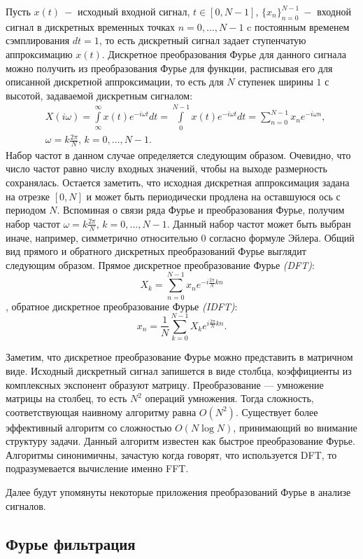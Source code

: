 Пусть $x(t) ~-$ исходный входной сигнал,  $t \in [0, N-1]$, $\{x_n\}_{n=0}^{N-1} ~-$ входной сигнал в дискретных временных точках $n=0,\dots,N-1$ c постоянным временем сэмплирования $dt=1$, то есть дискретный сигнал задает ступенчатую аппроксимацию $x(t)$.
Дискретное преобразования Фурье для данного сигнала можно получить из преобразования Фурье для функции, расписывая его для описанной дискретной аппроксимации, то есть для $N$ ступенек ширины $1$ с высотой, задаваемой дискретным сигналом:
\begin{align*}  
& X(i \omega) = \int \limits_{\infty}^{\infty} x(t) e^{-i\omega t} dt = \int \limits_{0}^{N-1} x(t) e^{-i\omega t} dt = \sum \limits _{n=0}^{N-1} x_n e^{-i \omega n},\\
& \omega=k \frac{2 \pi}{N}, \, k=0,\dots,N-1.
\end{align*}
Набор частот в данном случае определяется следующим образом. Очевидно, что число частот равно числу входных значений, чтобы на выходе размерность сохранялась. Остается заметить, что исходная дискретная аппроксимация задана на отрезке $[0, N]$ и может быть периодически продлена на оставшуюся ось с периодом $N$. Вспоминая о связи ряда Фурье и преобразования Фурье, получим набор частот $\omega=k \frac{2 \pi}{N}, \, k=0,\dots,N-1$. Данный набор частот может быть выбран иначе, например, симметрично относительно $0$ согласно формуле Эйлера.
Общий вид прямого и обратного дискретных преобразований Фурье выглядит следующим образом. Прямое дискретное преобразование Фурье \textit{(DFT)}: 
$$X_k = \sum \limits _{n=0}^{N-1} x_n e^{-i\frac{2 \pi}{N}kn}$$,
обратное дискретное преобразование Фурье \textit{(IDFT)}:
$$x_n = \frac{1}{N} \sum \limits _{k=0}^{N-1} X_k e^{i\frac{2 \pi}{N}kn}.$$ 

Заметим, что дискретное преобразование Фурье можно представить в матричном виде. Исходный дискретный сигнал запишется в виде столбца, коэффициенты из комплексных экспонент образуют матрицу. Преобразование — умножение матрицы на столбец, то есть $N^2$ операций умножения.  Тогда сложность, соответствующая наивному алгоритму равна $O(N^2)$. Существует более эффективный алгоритм со сложностью $O(N \log N)$, принимающий во внимание структуру задачи. Данный алгоритм известен как быстрое преобразование Фурье. Алгоритмы синонимичны, зачастую когда говорят, что используется DFT, то подразумевается вычисление именно FFT.

Далее будут упомянуты некоторые приложения преобразований Фурье в анализе сигналов. 

\subsection{Фурье фильтрация}


